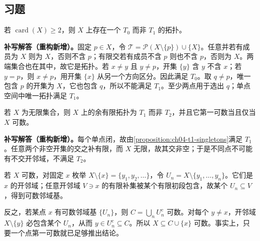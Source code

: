 \documentclass[../../main.tex]{subfiles}%
\begin{document}
\subsection*{习题}
\begin{exercise}\label{exercise:ch04-t0-not-t1}
若 $\operatorname{card}(X)\ge2$，则 $X$ 上存在一个 $T_0$ 而非 $T_1$ 的拓扑。
\end{exercise}
\begin{solution}
\textbf{补写解答（重构新增）。}固定 $p\in X$，令 $\mathcal T=\mathscr P(X\setminus\{p\})\cup\{X\}$。任意并若有成员为 $X$ 则为 $X$，否则不含 $p$；有限交若有成员不含 $p$ 则也不含 $p$，否则为 $X$。两端集合也在其中，故它是拓扑。若 $x\ne y$ 且 $y\ne p$，开集 $\{y\}$ 含 $y$ 不含 $x$；若 $y=p$，则 $x\ne p$，用开集 $\{x\}$ 从另一个方向区分。因此满足 $T_0$。取 $q\ne p$，唯一包含 $p$ 的开集为 $X$，它也包含 $q$，所以不能满足 $T_1$。至少两点用于选出 $q$；单点空间中唯一拓扑满足 $T_1$。
\end{solution}
\begin{exercise}\label{exercise:ch04-cofinite-countability}
若 $X$ 为无限集合，则 $X$ 上的余有限拓扑为 $T_1$ 而非 $T_2$，并且它第一可数当且仅当 $X$ 可数。
\end{exercise}
\begin{solution}
\textbf{补写解答（重构新增）。}每个单点闭，故由\cref{proposition:ch04-t1-singletons}满足 $T_1$。任意两个非空开集的交之补有限，而 $X$ 无限，故其交非空；于是不同点不可能有不交开邻域，不满足 $T_2$。

若 $X$ 可数，对固定 $x$ 枚举 $X\setminus\{x\}=\{y_1,y_2,\ldots\}$，令 $U_n=X\setminus\{y_1,\ldots,y_n\}$。它们是 $x$ 的开邻域；任意开邻域 $V\ni x$ 的有限补集被某个有限初段包含，故某个 $U_n\subseteq V$，得到可数邻域基。

反之，若某点 $x$ 有可数邻域基 $\{U_n\}$，则 $C=\bigcup_nU_n^c$ 可数。对每个 $y\ne x$，开邻域 $X\setminus\{y\}$ 必包含某个 $U_n$，从而 $y\in U_n^c\subseteq C$。所以 $X\subseteq C\cup\{x\}$ 可数。事实上，只要一个点第一可数就已足够推出结论。
\end{solution}
\end{document}
